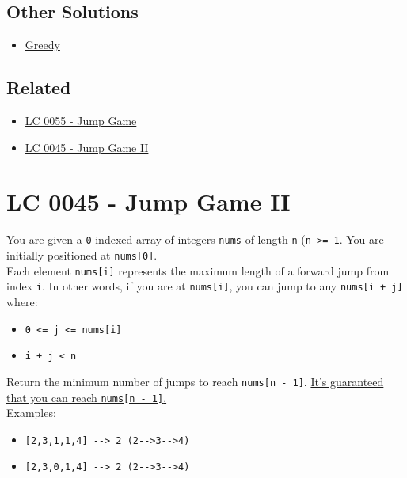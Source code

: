 \subsection*{Other Solutions}
\begin{itemize}
	\item \hyperref[solution:lc0055_greedy]{Greedy}
\end{itemize}

\subsection*{Related}
\begin{itemize}
	\item \hyperref[lc0055]{LC 0055 - Jump Game}
	\item \hyperref[lc0045]{LC 0045 - Jump Game II}
\end{itemize}

\section{LC 0045 - Jump Game II}
You are given a {\colorbox{CodeBackground}{\lstinline|0|}}-indexed array of integers {\colorbox{CodeBackground}{\lstinline|nums|}} of length {\colorbox{CodeBackground}{\lstinline|n|}} ({\colorbox{CodeBackground}{\lstinline|n >= 1|}}. You are initially positioned at {\colorbox{CodeBackground}{\lstinline|nums[0]|}}. \\

Each element {\colorbox{CodeBackground}{\lstinline|nums[i]|}} represents the maximum length of a forward jump from index {\colorbox{CodeBackground}{\lstinline|i|}}. In other words, if you are at {\colorbox{CodeBackground}{\lstinline|nums[i]|}}, you can jump to any {\colorbox{CodeBackground}{\lstinline|nums[i + j]|}} where:
\begin{itemize}
	\item {\colorbox{CodeBackground}{\lstinline|0 <= j <= nums[i]|}}
	\item {\colorbox{CodeBackground}{\lstinline|i + j < n|}}
\end{itemize}

Return the minimum number of jumps to reach {\colorbox{CodeBackground}{\lstinline|nums[n - 1]|}}. \ul{It's guaranteed that you can reach {\colorbox{CodeBackground}{\lstinline|nums[n - 1]|}}.}\\

Examples:
\begin{itemize}
	\item {\colorbox{CodeBackground}{\lstinline|[2,3,1,1,4] --> 2 (2-->3-->4)|}}
	\item {\colorbox{CodeBackground}{\lstinline|[2,3,0,1,4] --> 2 (2-->3-->4)|}}
\end{itemize}

